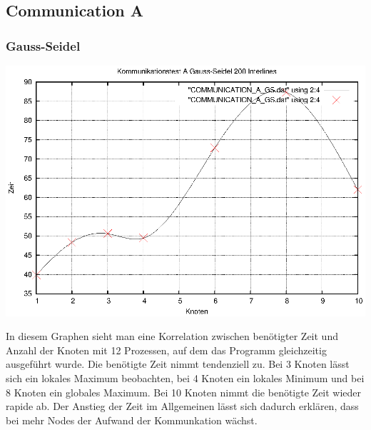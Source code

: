 \documentclass[a4paper,12pt]{scrartcl}
\title{\titleinfo}
\author{Sönke Kracht, Sven-Hendrik Haase}
\date{\today}
\begin{document}
\maketitle
\notag

\subsection{Communication A}
\subsubsection{Gauss-Seidel}
\begin{multicols}{2}
\includegraphics[scale=0.5]{results/COMMUNICATION_A_GS.eps}

\end{multicols}

In diesem Graphen sieht man eine Korrelation zwischen benötigter Zeit
und Anzahl der Knoten mit 12 Prozessen, auf dem das Programm
gleichzeitig ausgeführt wurde. Die benötigte Zeit nimmt tendenziell zu.
Bei 3 Knoten lässt sich ein lokales Maximum beobachten, bei 4 Knoten
ein lokales Minimum und bei 8 Knoten ein globales Maximum.
Bei 10 Knoten nimmt die benötigte Zeit wieder rapide ab.
Der Anstieg der Zeit im Allgemeinen
lässt sich dadurch erklären, dass bei mehr Nodes der
Aufwand der Kommunkation wächst.

\newpage
\end{document}
